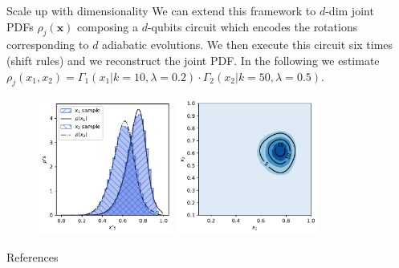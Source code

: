 \documentclass[20pt, final]{beamer}
\newlength{\sepwidth}
\newlength{\colwidth}
\newcommand{\separatorcolumn}{\begin{column}{\sepwidth}\end{column}}
\begin{document}
\begin{frame}[t]
\begin{columns}[t]
\begin{column}{\colwidth}
  \begin{block}{Scale up with dimensionality}
  We can extend this framework to $d$-dim joint PDFs $\rho_j(\bm{x})$ composing a $d$-qubits circuit 
  which encodes the rotations corresponding to $d$ adiabatic evolutions.
  We then execute this circuit six times (shift rules) and we reconstruct the joint PDF.
  In the following we estimate $\rho_j(x_1,x_2) = \Gamma_1(x_1| k=10, \lambda=0.2) \cdot \Gamma_2(x_2| k=50, \lambda=0.5).$
  \begin{figure}
    \includegraphics[width=0.415\textwidth]{figures/2pdfs.pdf}%
    \includegraphics[width=0.44\textwidth]{figures/contour.pdf}%
  \end{figure}
  \end{block}

\vspace{-1cm}
\begin{block}{References}
  \nocite{*}
    \small  {}
  \end{block}
\end{column}

\separatorcolumn
\end{columns}
\end{frame}
\end{document}
